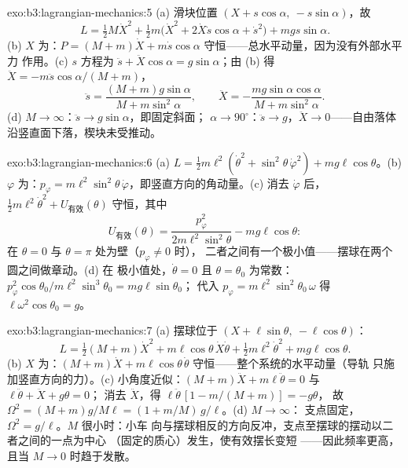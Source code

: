 \begin{solution}{exo:b3:lagrangian-mechanics:5}
(a) 滑块位置 $(X + s\cos\alpha,\ -s\sin\alpha)$，故
\[
L = \tfrac12 M\dot X^2 + \tfrac12 m\big(\dot X^2 +
2\dot X\dot s\cos\alpha + \dot s^2\big) + mgs\sin\alpha .
\]
(b) $X$ 为：$P = (M + m)\dot X + m\dot s\cos\alpha$
守恒——总水平动量，因为没有外部水平力
作用。(c) $s$ 方程为 $\ddot s + \ddot
X\cos\alpha = g\sin\alpha$；由 (b) 得 $\ddot X = -m\ddot s\cos\alpha/(M +
m)$，
\[
\ddot s = \frac{(M + m)g\sin\alpha}{M + m\sin^2\alpha} , \qquad
\ddot X = -\frac{mg\sin\alpha\cos\alpha}{M + m\sin^2\alpha} .
\]
(d) $M \to \infty$：$\ddot s \to g\sin\alpha$，即固定斜面；
$\alpha \to 90^\circ$：$\ddot s \to g$，$\ddot X \to 0$——自由落体
沿竖直面下落，楔块未受推动。
\end{solution}

\begin{solution}{exo:b3:lagrangian-mechanics:6}
(a) $L = \tfrac12 m\ell^2(\dot\theta^2 + \sin^2\theta\,\dot\varphi^2) +
mg\ell\cos\theta$。(b) $\varphi$ 为：$p_\varphi =
m\ell^2\sin^2\theta\,\dot\varphi$，即竖直方向的角动量。(c)
消去 $\dot\varphi$ 后，$\tfrac12 m\ell^2\dot\theta^2 +
U_{\text{有效}}(\theta)$ 守恒，其中
\[
U_{\text{有效}}(\theta) = \frac{p_\varphi^2}{2m\ell^2\sin^2\theta}
 - mg\ell\cos\theta :
\]
在 $\theta = 0$ 与 $\theta = \pi$ 处为壁（$p_\varphi \neq 0$ 时），
二者之间有一个极小值——摆球在两个圆之间做章动。(d) 在
极小值处，$\dot\theta = 0$ 且 $\theta = \theta_0$ 为常数：
$p_\varphi^2\cos\theta_0/m\ell^2\sin^3\theta_0 = mg\ell\sin\theta_0$；
代入 $p_\varphi = m\ell^2\sin^2\theta_0\,\omega$ 得
$\ell\omega^2\cos\theta_0 = g$。
\end{solution}

\begin{solution}{exo:b3:lagrangian-mechanics:7}
(a) 摆球位于 $(X + \ell\sin\theta,\ -\ell\cos\theta)$：
\[
L = \tfrac12(M + m)\dot X^2 + m\ell\cos\theta\,\dot X\dot\theta
 + \tfrac12 m\ell^2\dot\theta^2 + mg\ell\cos\theta .
\]
(b) $X$ 为：$(M + m)\dot X + m\ell\cos\theta\,\dot\theta$
守恒——整个系统的水平动量（导轨
只施加竖直方向的力）。(c) 小角度近似：$(M + m)\ddot X +
m\ell\ddot\theta = 0$ 与 $\ell\ddot\theta + \ddot X + g\theta = 0$；
消去 $\ddot X$，得 $\ell\ddot\theta\,[1 - m/(M + m)] = -g\theta$，
故 $\Omega^2 = (M + m)g/M\ell = (1 + m/M)\,g/\ell$。(d) $M \to \infty$：
支点固定，$\Omega^2 = g/\ell$。$M$ 很小时：小车
向与摆球相反的方向反冲，支点至摆球的摆动以二者之间的一点为中心
（固定的质心）发生，使有效摆长变短
——因此频率更高，且当 $M \to 0$ 时趋于发散。
\end{solution}

